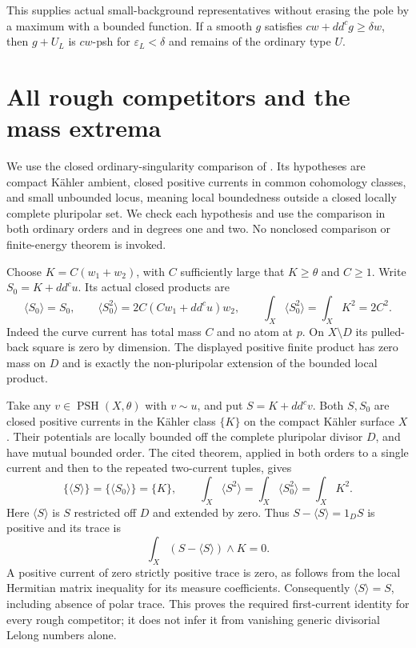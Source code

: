 \documentclass[11pt]{article}
\newcommand{\ddc}{dd^c}
\newcommand{\PSH}{\operatorname{PSH}}
\begin{document}
This supplies actual small-background representatives without erasing the
pole by a maximum with a bounded function. If a smooth $g$ satisfies
$cw+\ddc g\geq\delta w$, then $g+U_L$ is $cw$-psh for
$\varepsilon_L<\delta$ and remains of the ordinary type $U$.

\section{All rough competitors and the mass extrema}
We use the closed ordinary-singularity comparison of
\cite[Theorem~1.16]{BEGZ}. Its hypotheses are compact K\"ahler ambient,
closed positive currents in common cohomology classes, and small unbounded
locus, meaning local boundedness outside a closed locally complete
pluripolar set. We check each hypothesis and use the comparison in both
ordinary orders and in degrees one and two. No nonclosed comparison
or finite-energy theorem is invoked.

Choose $K=C(w_1+w_2)$, with $C$ sufficiently large that $K\geq\theta$
and $C\geq1$. Write $S_0=K+\ddc u$. Its actual closed products are
\[
 \langle S_0\rangle=S_0,\qquad
 \langle S_0^2\rangle=2C(Cw_1+\ddc u)w_2,
 \qquad\int_X\langle S_0^2\rangle=\int_XK^2=2C^2.
\]
Indeed the curve current has total mass $C$ and no atom at $p$.
On $X\setminus D$ its pulled-back square is zero by dimension.
The displayed positive finite product has zero mass on $D$ and is
exactly the non-pluripolar extension of the bounded local product.

Take any $v\in\PSH(X,\theta)$ with $v\sim u$, and put
$S=K+\ddc v$. Both $S,S_0$ are closed positive currents in the
K\"ahler class $\{K\}$ on the compact K\"ahler surface $X$.
Their potentials are locally bounded off the complete pluripolar divisor
$D$, and have mutual bounded order. The cited theorem, applied in both
orders to a single current and then to the repeated two-current tuples,
gives
\[
 \{\langle S\rangle\}=\{\langle S_0\rangle\}=\{K\},\qquad
 \int_X\langle S^2\rangle=\int_X\langle S_0^2\rangle=\int_XK^2.
\]
Here $\langle S\rangle$ is $S$ restricted off $D$ and extended
by zero. Thus $S-\langle S\rangle=1_DS$ is positive and its trace is
\[
 \int_X(S-\langle S\rangle)\wedge K=0.
\]
A positive current of zero strictly positive trace is zero, as follows
from the local Hermitian matrix inequality for its measure coefficients.
Consequently $\langle S\rangle=S$, including absence of polar trace.
This proves the required first-current identity for every rough competitor;
it does not infer it from vanishing generic divisorial Lelong numbers alone.
\end{document}
